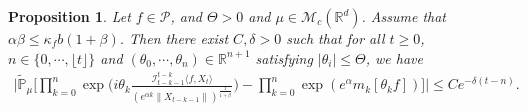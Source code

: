 \documentclass[12pt,a4paper]{amsart}
\theoremstyle{plain}
\newtheorem{prop}[thm]{Proposition}
\theoremstyle{definition}
\numberwithin{equation}{section}
\begin{document}
\begin{prop}\label{corollary31}
Let $f\in \mathcal{P}$, and $\Theta >0$ and $\mu\in \mathcal M_c(\mathbb R^d)$.
Assume that $\alpha\beta\leq\kappa_fb(1+\beta)$. Then there exist $C,\delta>0$ such that
for all $t\geq 0$,
$n \in \{0, \cdots, \lfloor t \rfloor\}$ and $(\theta_0, \cdots, \theta_n)\in \mathbb R^{n+1}$
satisfying $|\theta_i|\leq \Theta$, we have
\begin{equation}\begin{split}
\label{32corollary}
    \Big|\mathbb{\tilde{P}}_{\mu}\Big[\prod_{k=0}^n\exp\Big(i\theta_k \frac {\mathcal I_{t-k-1}^{t-k}\langle f ,X_t\rangle}{(e^{\alpha k}\|X_{t-k-1}\|)^\frac{1}{1+\beta}}\Big)-\prod_{k=0}^n\exp(e^{\alpha}m_k[\theta_k f])\Big]\Big|\leq C e^{-\delta(t-n)}.
\end{split}\end{equation}
\end{prop}
\end{document}
